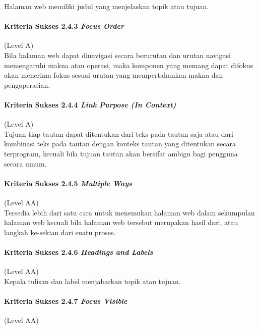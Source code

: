 \documentclass[a4paper,twoside]{article}
\begin{document}
\begin{enumerate}
		Halaman web memiliki judul yang menjelaskan topik atau tujuan.

		\paragraph{Kriteria Sukses 2.4.3 \textit{Focus Order}}
		\label{sec:kriteria_sukses_2.4.3}
		(Level A)\\

		Bila halaman web dapat dinavigasi secara berurutan dan urutan navigasi memengaruhi makna atau operasi, maka komponen yang memang dapat difokus akan menerima fokus sesuai urutan yang mempertahankan makna dan pengoperasian.

		\paragraph{Kriteria Sukses 2.4.4 \textit{Link Purpose (In Context)}}
		\label{sec:kriteria_sukses_2.4.4}
		(Level A)\\

		Tujuan tiap tautan dapat ditentukan dari teks pada tautan saja atau dari kombinasi teks pada tautan dengan konteks tautan yang ditentukan secara terprogram, kecuali bila tujuan tautan akan bersifat ambigu bagi pengguna secara umum.

		\paragraph{Kriteria Sukses 2.4.5 \textit{Multiple Ways}}
		\label{sec:kriteria_sukses_2.4.5}
		(Level AA)\\

		Tersedia lebih dari satu cara untuk menemukan halaman web dalam sekumpulan halaman web kecuali bila halaman web tersebut merupakan hasil dari, atau langkah ke-sekian dari suatu proses.

		\paragraph{Kriteria Sukses 2.4.6 \textit{Headings and Labels}}
		\label{sec:kriteria_sukses_2.4.6}
		(Level AA)\\
		Kepala tulisan dan label menjabarkan topik atau tujuan.

		\paragraph{Kriteria Sukses 2.4.7 \textit{Focus Visible}}
		\label{sec:kriteria_sukses_2.4.7}
		(Level AA)\\


\end{enumerate}
\end{document}
